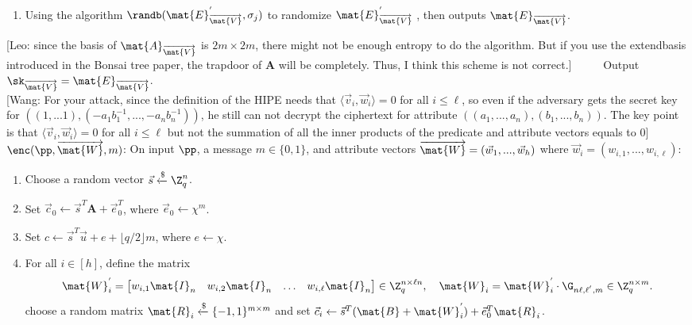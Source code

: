 \documentclass[11pt,hidelinks]{article}
\newcommand{\leo}[1]{{\color{cyan}[Leo: #1]}}
\newcommand{\wang}[1]{{\color{red}[Wang: #1]}}
\begin{document}
\begin{appendix}
\begin{enumerate}
\item Using the algorithm $\randb(\mat{E}^{'}_{\overrightarrow{\mat{V}}}, \sigma_{j})$ to randomize $\mat{E}^{'}_{\overrightarrow{\mat{V}}}$ , then outputs $\mat{E}_{\overrightarrow{\mat{V}}}$.
\end{enumerate}
\leo{since the basis of $\mat{A}_{\overrightarrow{\mat{V}}}$ is $2m \times 2m$, there might not be enough entropy to do the algorithm. But if you use the extendbasis introduced in the Bonsai tree paper, the trapdoor of $\mathbf{A}$ will be completely. Thus, I think this scheme is not correct.}
~~~~~Output $\sk_{\overrightarrow{\mat{V}}}=\mat{E}_{\overrightarrow{\mat{V}}}$.\\[0.4cm]
\wang{For your attack, since the definition of the HIPE needs that $\langle \vec{v}_{i}, \vec{w}_{i} \rangle = 0$ for all $i\leq \ell$, so even if the adversary gets the secret key for $((1,...1),(-a_{1}b^{-1}_{1},...,-a_{n}b^{-1}_{n}))$, he still can not decrypt the ciphertext for attribute $((a_{1},...,a_{n}),(b_{1},...,b_{n}))$. The key point is that $\langle \vec{v}_{i}, \vec{w}_{i} \rangle = 0$ for all $i\leq \ell$ but not the summation of all the inner products of the predicate and attribute vectors equals to $0$}\\[0.4cm]
$\enc(\pp, \overrightarrow{\mat{W}}, m)$: On input $\pp$, a message $m \in \{0,1\}$, and attribute vectors $\overrightarrow{\mat{W}}=(\vec{w}_{1},...,\vec{w}_{h})$ where $\vec{w}_{i}=(w_{i,1},...,w_{i,\ell})$:
\begin{enumerate}
\item Choose a random vector $\vec{s} \xleftarrow{\$} \Z^{n}_{q}$.
\item Set $\vec{c}_{0}\leftarrow \vec{s}^{T}\textbf{A}+ \vec{e}^{T}_{0}$, where $\vec{e}_{0}\leftarrow \chi^{m}$.
\item Set $c\leftarrow \vec{s}^{T}\vec{u}+e+\lfloor q/2 \rfloor m$, where $e\leftarrow \chi$.
\item For all $i \in [h]$, define the matrix
\begin{equation}
\mat{W}^{'}_{i}= \begin{bmatrix}
w_{i,1} \mat{I}_{n}&w_{i,2} \mat{I}_{n}&\ldots&w_{i,\ell} \mat{I}_{n}
\end{bmatrix} \in \Z^{n \times \ell n}_{q},~~~ \mat{W}_{i}=\mat{W}^{'}_{i}\cdot \G_{n\ell,\ell^{'},m} \in \Z^{n \times m}_{q}.
\end{equation}
choose a random matrix $\mat{R}_{i} \xleftarrow{\$} \{-1,1\}^{m \times m}$ and set $\vec{c}_{i} \leftarrow \vec{s}^{T}(\mat{B}+ \mat{W}^{'}_{i})+ \vec{e}^{T}_{0}\mat{R}_{i}$.

\end{enumerate}
\end{appendix}
\end{document}
